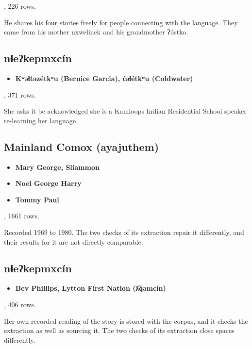 \cite{src:LaFontaine-and-Janzen-2024}, 226 rows.

He shares his four stories freely for people connecting with the language. They came from his mother nxwelinek and his grandmother ʔústko.

\subsection{nɬeʔkepmxcín}

\begin{itemize}
\item \textbf{Kʷəɬtəzétkʷu (Bernice Garcia), c̓əɬétkʷu (Coldwater)}
\end{itemize}

\cite{src:Garcia-Hannon-and-Stacey-2024}, 371 rows.

She asks it be acknowledged she is a Kamloops Indian Residential School speaker re-learning her language.

\subsection{Mainland Comox (ayajuthem)}

\begin{itemize}
\item \textbf{Mary George, Sliammon}
\item \textbf{Noel George Harry}
\item \textbf{Tommy Paul}
\end{itemize}

\cite{src:John-Hamilton-Davis-2021}, 1661 rows.

Recorded 1969 to 1980. The two checks of its extraction repair it differently, and their results for it are not directly comparable.

\subsection{nɬeʔkepmxcín}

\begin{itemize}
\item \textbf{Bev Phillips, Lytton First Nation (ƛ̓q̓əmcín)}
\end{itemize}

\cite{src:Hall-and-Phillips-2025}, 406 rows.

Her own recorded reading of the story is stored with the corpus, and it checks the extraction as well as sourcing it. The two checks of its extraction close spaces differently.

